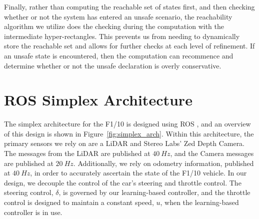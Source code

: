 \documentclass[manuscript,screen,review]{acmart}
\begin{document}
Finally, rather than computing the reachable set of states first, and then checking whether or not the system has entered an unsafe scenario, the reachability algorithm we utilize does the checking during the computation with the intermediate hyper-rectangles. This prevents us from needing to dynamically store the reachable set and allows for further checks at each level of refinement. If an unsafe state is encountered, then the computation can recommence and determine whether or not the unsafe declaration is overly conservative.


%
%

\section{ROS Simplex Architecture}



\label{section:simplex}
The simplex architecture for the F1/10 is designed using ROS \cite{ROS}, and an overview of this design is shown in Figure~\ref{fig:simplex_arch}. Within this architecture, the primary sensors we rely on are a LiDAR and Stereo Labs' Zed Depth Camera. The messages from the LiDAR are published at $40 \ Hz$, and the Camera messages are published at $20 \ Hz$. Additionally, we rely on odometry information, published at $40 \ Hz$, in order to accurately ascertain the state of the F1/10 vehicle. In our design, we decouple the control of the car's steering and throttle control. The steering control, $\delta$, is governed by our learning-based controller, and the throttle control is designed to maintain a constant speed, $u$, when the learning-based controller is in use. 
\end{document}
